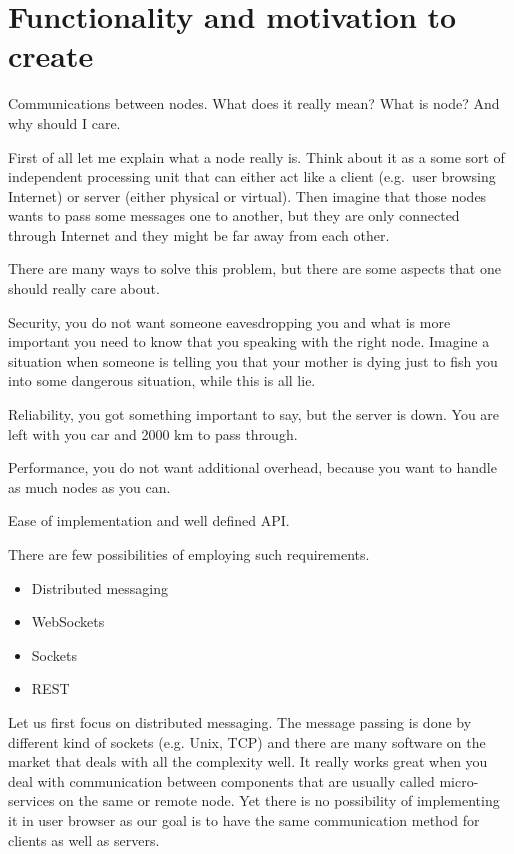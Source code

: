 \section{Functionality and motivation to create}
Communications between nodes. What does it really mean? What is node? And why should I care.

First of all let me explain what a node really is. Think about it as a some sort of independent processing unit that can either act like a client (e.g.\ user browsing Internet) or server (either physical or virtual). Then imagine that those nodes wants to pass some messages one to another, but they are only connected through Internet and they might be far away from each other.

There are many ways to solve this problem, but there are some aspects that one should really care about.

Security, you do not want someone eavesdropping you and what is more important you need to know that you speaking with the right node. Imagine a situation when someone is telling you that your mother is dying just to fish you into some dangerous situation, while this is all lie.

Reliability, you got something important to say, but the server is down. You are left with you car and 2000 km to pass through.

Performance, you do not want additional overhead, because you want to handle as much nodes as you can.

Ease of implementation and well defined API\@.

There are few possibilities of employing such requirements.
\begin{itemize}
\item Distributed messaging
\item WebSockets
\item Sockets
\item REST
\end{itemize}

Let us first focus on distributed messaging. The message passing is done by different kind of sockets (e.g. Unix, TCP) and there are many software on the market that deals with all the complexity well. It really works great when you deal with communication between components that are usually called micro-services on the same or remote node. Yet there is no possibility of implementing it in user browser as our goal is to have the same communication method for clients as well as servers.

